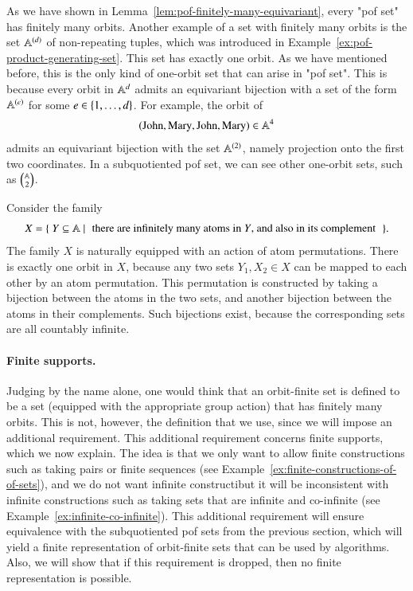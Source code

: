 \begin{myexample}
    \label{ex:finite-constructions-of-of-sets}
     As we have shown in Lemma~\ref{lem:pof-finitely-many-equivariant}, every "pof set" has finitely many orbits. Another example of a set with finitely many orbits is the set $\mathbb A^{(d)}$ of non-repeating tuples, which was introduced in Example~\ref{ex:pof-product-generating-set}. This set has exactly one orbit. As we have mentioned before, this is the only kind of one-orbit set that can arise in "pof set". This is because  every orbit in $\mathbb A^d$ admits an equivariant bijection with a set of the form $\mathbb A^{(e)}$ for some $e \in \{1,\ldots,d\}$. For example, the orbit of 
    \begin{align*}
    (\text{John},\text{Mary},\text{John},\text{Mary}) \in \mathbb A^4
    \end{align*}
admits an equivariant bijection with the set $\mathbb A^{(2)}$, namely projection onto the first two coordinates. In a subquotiented pof set, we can see other one-orbit sets, such as $\mathbb A \choose 2$. 
\end{myexample}

\begin{myexample}
\label{ex:infinite-co-infinite}
    Consider the family 
    \begin{align*}
    X = \setbuild { Y \subseteq \atoms}{there are infinitely many atoms in $Y$, and also in its complement}.
    \end{align*}
    The family $X$ is naturally equipped with an action of atom permutations. There is exactly one orbit in $X$, because any two sets $Y_1,X_2 \in X$ can be mapped to each other  by an atom permutation. This permutation is constructed by taking a bijection between the atoms in the two sets, and another bijection between the atoms in their complements. Such bijections exist, because the corresponding sets are all countably infinite.
\end{myexample}



\paragraph*{Finite supports.} Judging by the name alone, one would think that an orbit-finite set  is defined to be a set (equipped with the appropriate group action) that has finitely many orbits. This is not, however, the definition that we use, since we will impose an additional requirement. This additional requirement concerns finite supports, which we now explain. The idea is that we only want to allow  finite constructions such as taking pairs or finite sequences (see Example~\ref{ex:finite-constructions-of-of-sets}), and we do not want infinite constructibut it will be inconsistent with infinite constructions such as taking sets that are infinite and co-infinite (see Example~\ref{ex:infinite-co-infinite}). This additional requirement will ensure equivalence with the subquotiented pof sets from the previous section, which will yield a finite representation of orbit-finite sets that can be used by algorithms. Also, we will show that  if this requirement is dropped, then no finite representation is possible.


